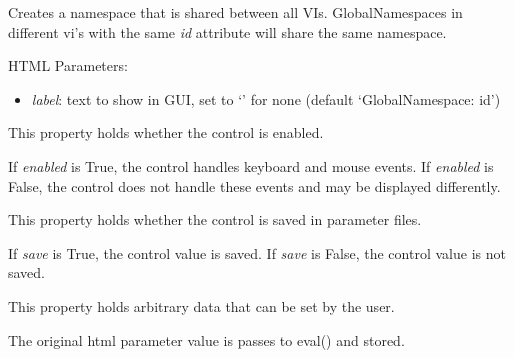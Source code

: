 \documentclass[letterpaper,10pt,english]{sphinxmanual}
\begin{document}

\begin{fulllineitems}
\label{api:controls.GlobalNamespace}
Creates a namespace that is shared between all VIs. GlobalNamespaces in
different vi's with the same \emph{id} attribute will share the same namespace.

HTML Parameters:
\begin{itemize}
\item {} 
\emph{label}: text to show in GUI, set to `' for none (default `GlobalNamespace: id')

\end{itemize}

\begin{fulllineitems}
\label{api:controls.GlobalNamespace.enabled}
This property holds whether the control is enabled.

If \emph{enabled} is True, the control handles keyboard and mouse events.
If \emph{enabled} is False, the control does not handle these events and may
be displayed differently.

\end{fulllineitems}


\begin{fulllineitems}
\label{api:controls.GlobalNamespace.save}
This property holds whether the control is saved in parameter files.

If \emph{save} is True, the control value is saved.
If \emph{save} is False, the control value is not saved.

\end{fulllineitems}


\begin{fulllineitems}
\label{api:controls.GlobalNamespace.user}
This property holds arbitrary data that can be set by the user.

The original html parameter value is passes to eval() and stored.

\end{fulllineitems}


\end{fulllineitems}
\end{document}
